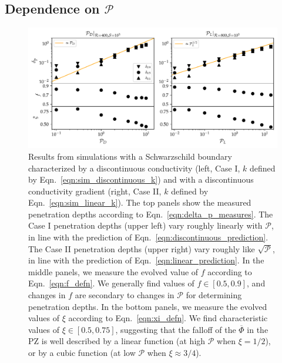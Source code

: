 \documentclass[twocolumn]{aastex631}
\newcommand{\mP}{\ensuremath{\mathcal{P}}}
\renewcommand{\bar}[1]{\overline{#1}}
\begin{document}
\subsection{Dependence on $\mP$}
\begin{figure}[t]
\centering
\includegraphics[width=\textwidth]{parameters_vs_p.pdf}
\caption{
Results from simulations with a Schwarzschild boundary characterized by a discontinuous conductivity (left, Case I, $k$ defined by Eqn.~\ref{eqn:sim_discontinuous_k}) and with a discontinuous conductivity gradient (right, Case II, $k$ defined by Eqn.~\ref{eqn:sim_linear_k}).
The top panels show the measured penetration depths according to Eqn.~\ref{eqn:delta_p_measures}.
The Case I penetration depths (upper left) vary roughly linearly with $\mP$, in line with the prediction of Eqn.~\ref{eqn:discontinuous_prediction}.
The Case II penetration depths (upper right) vary roughly like $\sqrt{\mP}$, in line with the prediction of Eqn.~\ref{eqn:linear_prediction}.
In the middle panels, we measure the evolved value of $f$ according to Eqn.~\ref{eqn:f_defn}.
We generally find values of $f \in [0.5, 0.9]$, and changes in $f$ are secondary to changes in $\mP$ for determining penetration depths.
In the bottom panels, we measure the evolved values of $\xi$ according to Eqn.~\ref{eqn:xi_defn}.
We find characteristic values of $\xi \in [0.5, 0.75]$, suggesting that the falloff of the $\bar{\Phi}$ in the PZ is well described by a linear function (at high $\mP$ when $\xi = 1/2$), or by a cubic function (at low $\mP$ when $\xi \approx 3/4$).
\label{fig:parameters_vs_p}
}
\end{figure}
\end{document}
